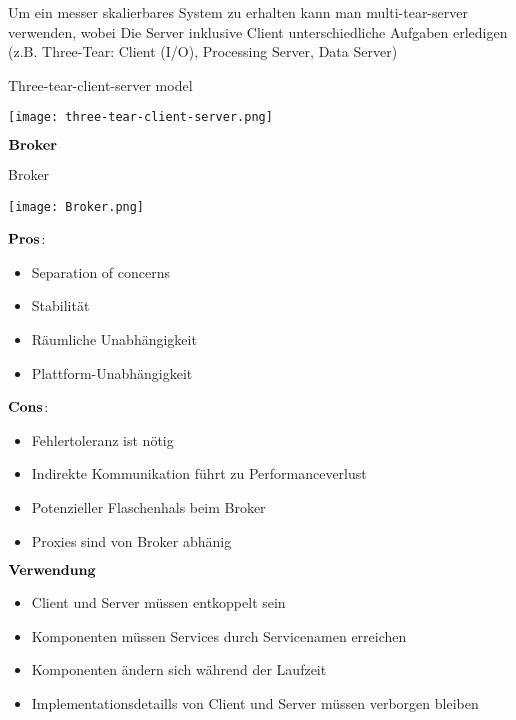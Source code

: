 Um ein messer skalierbares System zu erhalten kann man multi-tear-server verwenden, wobei Die Server inklusive Client unterschiedliche Aufgaben erledigen (z.B. Three-Tear: Client (I/O), Processing Server, Data Server) 
\begin{table}[H]
\caption{Three-tear-client-server model}
\texttt{[image: three-tear-client-server.png]}	
\end{table}

$\bold{Broker}$
\begin{table}[H]
\caption{Broker}
\texttt{[image: Broker.png]}	
\end{table}
\begin{multicols}{2}
$\bold{Pros}$:
\begin{itemize}
	\item Separation of concerns
	\item Stabilität
	\item Räumliche Unabhängigkeit 
	\item Plattform-Unabhängigkeit
\end{itemize}
\columnbreak
$\bold{Cons}$:
\begin{itemize}
	\item Fehlertoleranz ist nötig
	\item Indirekte Kommunikation führt zu Performanceverlust
	\item Potenzieller Flaschenhals beim Broker
	\item Proxies sind von Broker abhänig
\end{itemize}
\end{multicols}
$\bold{Verwendung}$
\begin{itemize}
	\item Client und Server müssen entkoppelt sein
	\item Komponenten müssen Services durch Servicenamen erreichen
	\item Komponenten ändern sich während der Laufzeit
	\item Implementationsdetaills von Client und Server müssen verborgen bleiben
\end{itemize}






